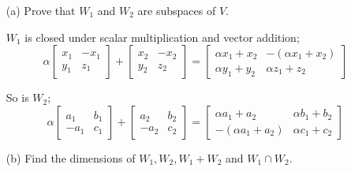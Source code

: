 \documentclass{article}
\begin{document}
\begin{enumerate}[listparindent=\parindent]
\begin{enumerate}[listparindent=\parindent]
    \item[(a)] Prove that \(W_1\) and \(W_2\) are subspaces of \(V\).

    \(W_1\) is closed under scalar multiplication and vector addition;
    \[
        \alpha
        \begin{bmatrix}
            x_1 & -x_1 \\
            y_1 & z_1
        \end{bmatrix}
        +
        \begin{bmatrix}
            x_2 & -x_2 \\
            y_2 & z_2
        \end{bmatrix}
        =
        \begin{bmatrix}
            \alpha x_1 + x_2 & -(\alpha x_1 + x_2) \\
            \alpha y_1 + y_2 & \alpha z_1 + z_2
        \end{bmatrix}
    \]

    So is \(W_2\);
    \[
        \alpha
        \begin{bmatrix}
            a_1 & b_1 \\
            -a_1 & c_1
        \end{bmatrix}
        +
        \begin{bmatrix}
            a_2 & b_2 \\
            -a_2 & c_2
        \end{bmatrix}
        =
        \begin{bmatrix}
            \alpha a_1 + a_2 & \alpha b_1 + b_2 \\
            -(\alpha a_1 + a_2) & \alpha c_1 + c_2
        \end{bmatrix}
    \]

    \item[(b)] Find the dimensions of \(W_1, W_2, W_1 + W_2\) and \(W_1 \cap W_2\).


\end{enumerate}
\end{enumerate}
\end{document}

